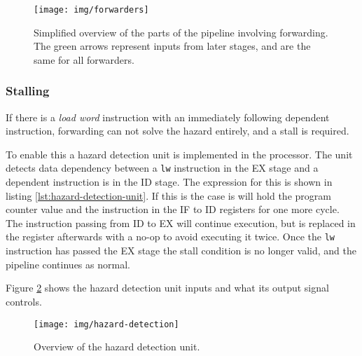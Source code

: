 
\begin{figure}[h]
    \centering
    \texttt{[image: img/forwarders]}
    \caption{Simplified overview of the parts of the pipeline involving forwarding. The green arrows represent inputs from later stages, and are the same for all forwarders.}
    \label{fig:forwarders}
\end{figure}

\subsubsection{Stalling}
If there is a \textit{load word} instruction with an immediately following dependent instruction,
forwarding can not solve the hazard entirely, and a stall is required.

To enable this a hazard detection unit is implemented in the processor.
The unit detects data dependency between a \texttt{lw} instruction in the EX stage and a dependent instruction is in the ID stage.
The expression for this is shown in listing \ref{lst:hazard-detection-unit}.
If this is the case is will hold the program counter value and the instruction in the IF to ID registers for one more cycle.
The instruction passing from ID to EX will continue execution,
but is replaced in the register afterwards with a no-op to avoid executing it twice.
Once the \texttt{lw} instruction has passed the EX stage the stall condition is no longer valid,
and the pipeline continues as normal.

Figure \ref{fig:hazard-detection} shows the hazard detection unit inputs and what its output signal controls.

\begin{figure}[h]
    \centering
    \texttt{[image: img/hazard-detection]}
    \caption{
      Overview of the hazard detection unit.
    }
    \label{fig:hazard-detection}
\end{figure}

